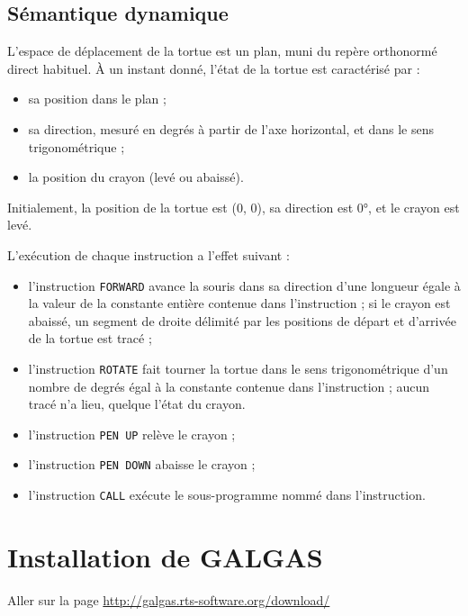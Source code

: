 \subsection{Sémantique dynamique}

L'espace de déplacement de la tortue est un plan, muni du repère orthonormé direct habituel. À un instant donné, l'état de la tortue est caractérisé par :
\begin{itemize}
  \item sa position dans le plan ;
  \item sa direction, mesuré en degrés à partir de l'axe horizontal, et dans le sens trigonométrique ;
  \item la position du crayon (levé ou abaissé).
\end{itemize}

Initialement, la position de la tortue est (0, 0), sa direction est 0°, et le crayon est levé.

L'exécution de chaque instruction a l'effet suivant :
\begin{itemize}
  \item l'instruction \texttt{FORWARD} avance la souris dans sa direction d'une longueur égale à la valeur de la constante entière contenue dans l'instruction ; si le crayon est abaissé, un segment de droite délimité par les positions de départ et d'arrivée de la tortue est tracé ;
  \item l'instruction \texttt{ROTATE} fait tourner la tortue dans le sens trigonométrique d'un nombre de degrés égal à la constante contenue dans l'instruction ; aucun tracé n'a lieu, quelque l'état du crayon.
  \item l'instruction \texttt{PEN UP} relève le crayon ;
  \item l'instruction \texttt{PEN DOWN} abaisse le crayon ;
  \item l'instruction \texttt{CALL} exécute le sous-programme nommé dans l'instruction.
\end{itemize}











\section{Installation de GALGAS}

Aller sur la page \url{http://galgas.rts-software.org/download/}

